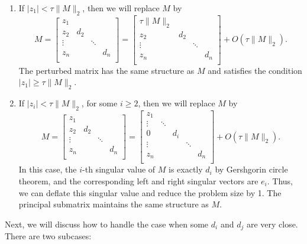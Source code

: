 \documentclass[12pt]{article}
\begin{document}
\begin{enumerate}
    \item If \(|z_1| < \tau \|M\|_2\), then we will replace \(M\) by
    \[
        M = \begin{bmatrix}
            z_1 \\
            z_2 & d_2 \\
            \vdots & & \ddots \\
            z_n & & & d_n \\
        \end{bmatrix} = \begin{bmatrix}
            \tau \|M\|_2 \\
            z_2 & d_2 \\
            \vdots & & \ddots \\
            z_n & & & d_n \\
        \end{bmatrix} + O(\tau \|M\|_2).
    \]
    The perturbed matrix has the same structure as \(M\) and satisfies the condition \(|z_1| \geq \tau \|M\|_2\).

    \item If \(|z_i| < \tau \|M\|_2\), for some \(i \geq 2\), then we will replace \(M\) by
    \[
        M = \begin{bmatrix}
            z_1 \\
            z_2 & d_2 \\
            \vdots & & \ddots \\
            z_n & & & d_n \\
        \end{bmatrix} = \begin{bmatrix}
            z_1 \\
            \vdots & \ddots \\
            0 & & d_i \\
            \vdots & & & \ddots \\
            z_n & & & & d_n \\
        \end{bmatrix} + O(\tau \|M\|_2).
    \]
    In this case, the \(i\)-th singular value of \(M\) is exactly \(d_i\) by Gershgorin circle theorem, and the corresponding left and right singular vectors are \(e_i\). Thus, we can deflate this singular value and reduce the problem size by 1. The principal submatrix maintains the same structure as \(M\).
\end{enumerate}

Next, we will discuss how to handle the case when some \(d_i\) and \(d_j\) are very close. There are two subcases:
\end{document}
